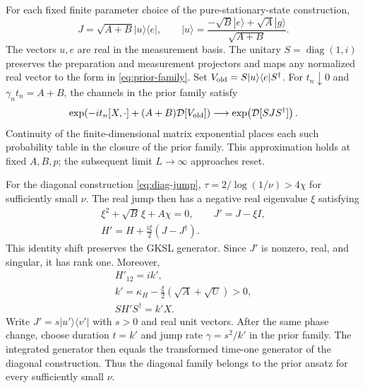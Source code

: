 \documentclass[aps,pra,reprint,amsmath,amssymb,nofootinbib,floatfix,longbibliography]{revtex4-2}
\theoremstyle{aps}
\DeclareMathOperator{\diag}{diag}
\newcommand{\Diss}{\mathcal D}
\newcommand{\ket}[1]{|#1\rangle}
\newcommand{\bra}[1]{\langle#1|}
\begin{document}
For each fixed finite parameter choice of the pure-stationary-state construction,
\begin{equation}\label{eq:prior-pure-rankone}
 J=\sqrt{A+B}\ket u\bra e,\qquad
 \ket u=\frac{-\sqrt B\ket e+\sqrt A\ket g}{\sqrt{A+B}}.
\end{equation}
The vectors $u,e$ are real in the measurement basis. The unitary $S=\diag(1,i)$ preserves the preparation and measurement projectors and maps any normalized real vector to the form in \eqref{eq:prior-family}. Set $V_{\rm old}=S\ket u\bra eS^\dagger$. For $t_n\downarrow0$ and $\gamma_nt_n=A+B$, the channels in the prior family satisfy
\begin{equation}\label{eq:prior-pure-limit}
 \exp\!\left(-it_n[X,\cdot]+(A+B)\Diss[V_{\rm old}]\right)
 \longrightarrow \exp\!\left(\Diss[SJS^\dagger]\right).
\end{equation}
Continuity of the finite-dimensional matrix exponential places each such probability table in the closure of the prior family. This approximation holds at fixed $A,B,p$; the subsequent limit $L\to\infty$ approaches reset.

For the diagonal construction \eqref{eq:diag-jump}, $\tau=2/\log(1/\nu)>4\chi$ for sufficiently small $\nu$. The real jump then has a negative real eigenvalue $\xi$ satisfying
\begin{equation}\label{eq:prior-diag-shift}
 \begin{gathered}
 \xi^2+\sqrt B\,\xi+A\chi=0,\qquad
 J'=J-\xi I,\\
 H'=H+\frac{i\xi}{2}(J-J^\dagger).
 \end{gathered}
\end{equation}
This identity shift preserves the GKSL generator. Since $J'$ is nonzero, real, and singular, it has rank one. Moreover,
\begin{equation}\label{eq:prior-diag-hamiltonian}
 \begin{gathered}
 H'_{12}=ik',\\
 k'=\kappa_H-\frac{\xi}{2}(\sqrt A+\sqrt U)>0,\\
 SH'S^\dagger=k'X.
 \end{gathered}
\end{equation}
Write $J'=s\ket{u'}\bra{v'}$ with $s>0$ and real unit vectors. After the same phase change, choose duration $t=k'$ and jump rate $\gamma=s^2/k'$ in the prior family. The integrated generator then equals the transformed time-one generator of the diagonal construction. Thus the diagonal family belongs to the prior ansatz for every sufficiently small $\nu$.
\end{document}
